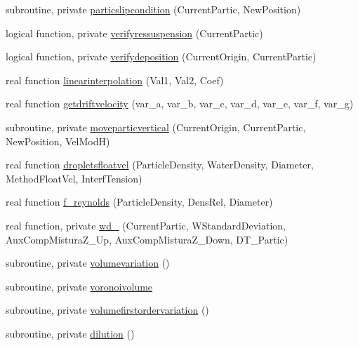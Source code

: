 \begin{DoxyCompactItemize}
\item 
subroutine, private \mbox{\hyperlink{namespacemodulelagrangianglobal_a59c3bacd80d2e9730bbf1bae5ae46304}{particslipcondition}} (Current\+Partic, New\+Position)
\item 
logical function, private \mbox{\hyperlink{namespacemodulelagrangianglobal_a690a5144506cf803e45f92de5eea31d7}{verifyressuspension}} (Current\+Partic)
\item 
logical function, private \mbox{\hyperlink{namespacemodulelagrangianglobal_ac2e61e57ce9a9bd0aef7e60998c77a7b}{verifydeposition}} (Current\+Origin, Current\+Partic)
\item 
real function \mbox{\hyperlink{namespacemodulelagrangianglobal_a0ac32542f936be812fbc775e622588ce}{linearinterpolation}} (Val1, Val2, Coef)
\item 
real function \mbox{\hyperlink{namespacemodulelagrangianglobal_a51b510de4fae6141e3b324bc961177d9}{getdriftvelocity}} (var\+\_\+a, var\+\_\+b, var\+\_\+c, var\+\_\+d, var\+\_\+e, var\+\_\+f, var\+\_\+g)
\item 
subroutine, private \mbox{\hyperlink{namespacemodulelagrangianglobal_abff124f5f5744390bce7f4e2ca7b33a4}{moveparticvertical}} (Current\+Origin, Current\+Partic, New\+Position, Vel\+ModH)
\item 
real function \mbox{\hyperlink{namespacemodulelagrangianglobal_a2080e5fc3db1ae9253fe08012623e1bf}{dropletsfloatvel}} (Particle\+Density, Water\+Density, Diameter, Method\+Float\+Vel, Interf\+Tension)
\item 
real function \mbox{\hyperlink{namespacemodulelagrangianglobal_abb6d8c7acaf1915a70609c5d8763d229}{f\+\_\+reynolds}} (Particle\+Density, Dens\+Rel, Diameter)
\item 
real function, private \mbox{\hyperlink{namespacemodulelagrangianglobal_a89664f3ed8eeda5bbe36dc80afc53a89}{wd\+\_\+}} (Current\+Partic, W\+Standard\+Deviation, Aux\+Comp\+Mistura\+Z\+\_\+\+Up, Aux\+Comp\+Mistura\+Z\+\_\+\+Down, D\+T\+\_\+\+Partic)
\item 
subroutine, private \mbox{\hyperlink{namespacemodulelagrangianglobal_af49b1a80eb0ff491949cf2b360fb430f}{volumevariation}} ()
\item 
subroutine, private \mbox{\hyperlink{namespacemodulelagrangianglobal_a302b214901c2710b5755117530d28d20}{voronoivolume}}
\item 
subroutine, private \mbox{\hyperlink{namespacemodulelagrangianglobal_a3b4d2f6226b807632b46704ab7cd6944}{volumefirstordervariation}} ()
\item 
subroutine, private \mbox{\hyperlink{namespacemodulelagrangianglobal_aa64605bdb86dfab0e679be6775d4e80f}{dilution}} ()

\end{DoxyCompactItemize}
